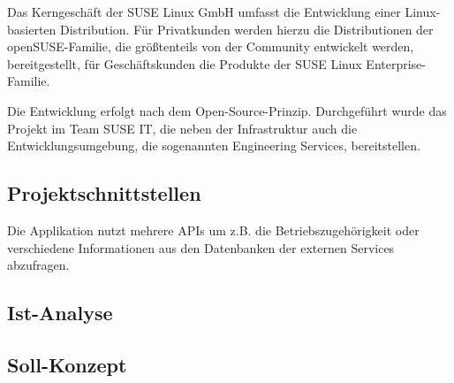Das Kerngeschäft der SUSE Linux GmbH umfasst die Entwicklung einer Linux-basierten Distribution.
Für Privatkunden werden hierzu die Distributionen der openSUSE-Familie, die größtenteils von der
Community entwickelt werden, bereitgestellt, für Geschäftskunden die Produkte der SUSE Linux
Enterprise-Familie.

Die Entwicklung erfolgt nach dem Open-Source-Prinzip.
Durchgeführt wurde das Projekt im Team SUSE IT, die neben der Infrastruktur auch die
Entwicklungsumgebung, die sogenannten Engineering Services, bereitstellen.

\subsection{Projektschnittstellen}
\label{sec:Projektschnittstellen}
Die Applikation nutzt mehrere APIs um z.B. die Betriebszugehörigkeit oder verschiedene Informationen
aus den Datenbanken der externen Services abzufragen.

\subsection{Ist-Analyse}
\label{sec:Ist-Analyse}

\subsection{Soll-Konzept}
\label{sec:Soll-Konzept}
